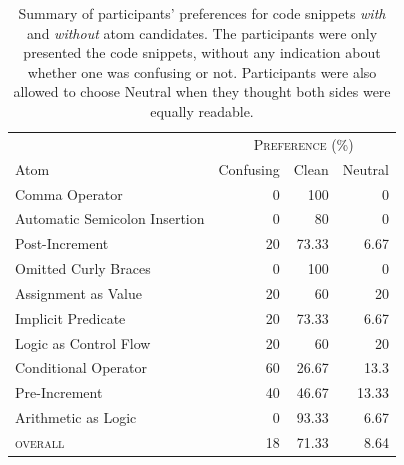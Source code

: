 \begin{table}[!htb]
    \centering
    \caption{Summary of participants' preferences for code snippets \emph{with} and
      \emph{without} atom candidates. The participants were only presented the code snippets, without any indication about whether one was confusing or not. 
      Participants were also allowed to choose Neutral when they thought both sides were equally readable.}
    \begin{tabular}{lrrr}\toprule
      & \multicolumn{3}{c}{\textsc{Preference (\%)}} \\
      \cmidrule(lr){2-4}
         Atom           & \multicolumn{1}{c}{Confusing}
                                      &  \multicolumn{1}{c}{Clean}
                                               & \multicolumn{1}{c}{Neutral} \\ \midrule
         Comma Operator                  & 0  & 100    & 0     \\
         Automatic Semicolon Insertion  & 0  & 80     & 0     \\
         Post-Increment                  & 20 & 73.33  & 6.67  \\
         Omitted Curly Braces            & 0  & 100    & 0     \\
         Assignment as Value             & 20 & 60     & 20    \\
         Implicit Predicate              & 20 & 73.33  & 6.67  \\
         Logic as Control Flow           & 20 & 60     & 20    \\
         Conditional Operator                & 60 & 26.67  & 13.3  \\
         Pre-Increment                   & 40 & 46.67  & 13.33 \\ 
         Arithmetic as Logic             & 0  & 93.33  & 6.67  \\ \midrule
         \textsc{overall}                & 18 & 71.33  & 8.64  \\
         \bottomrule
    \end{tabular}
    \label{tab:interview-results1}
\end{table}

